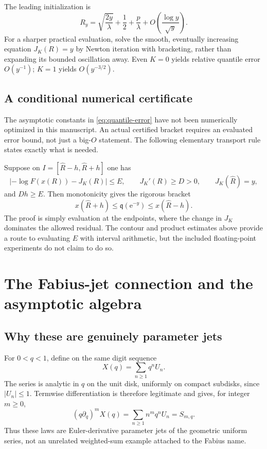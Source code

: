\documentclass[11pt,a4paper]{article}
\numberwithin{equation}{section}
\theoremstyle{definition}
\newcommand{\ee}{\mathrm e}
\begin{document}
The leading initialization is
\begin{equation}
 R_y=\sqrt{\frac{2y}{\lambda}}+\frac12+\frac p\lambda
       +O\left(\frac{\log y}{\sqrt y}\right).
 \label{eq:quantile-start}
\end{equation}
For a sharper practical evaluation, solve the smooth, eventually increasing equation $J_K(R)=y$ by Newton iteration with bracketing, rather than expanding its bounded oscillation away. Even $K=0$ yields relative quantile error $O(y^{-1})$; $K=1$ yields $O(y^{-3/2})$.

\subsection{A conditional numerical certificate}
The asymptotic constants in \eqref{eq:quantile-error} have not been numerically optimized in this manuscript. An actual certified bracket requires an evaluated error bound, not just a big-$O$ statement. The following elementary transport rule states exactly what is needed.

Suppose on $I=[\widehat R-h,\widehat R+h]$ one has
\[
 |{-\log F(x(R))}-J_K(R)|\leq E,\qquad J_K'(R)\geq D>0,
 \qquad J_K(\widehat R)=y,
\]
and $Dh\geq E$. Then monotonicity gives the rigorous bracket
\begin{equation}
 x(\widehat R+h)\leq\mathfrak q(\ee^{-y})\leq x(\widehat R-h).
 \label{eq:quantile-bracket}
\end{equation}
The proof is simply evaluation at the endpoints, where the change in $J_K$ dominates the allowed residual. The contour and product estimates above provide a route to evaluating $E$ with interval arithmetic, but the included floating-point experiments do not claim to do so.

\section{The Fabius-jet connection and the asymptotic algebra}
\label{sec:interpretation}

\subsection{Why these are genuinely parameter jets}
For $0<q<1$, define on the same digit sequence
\[
 X(q)=\sum_{n\geq1}q^nU_n.
\]
The series is analytic in $q$ on the unit disk, uniformly on compact subdisks, since $|U_n|\leq1$. Termwise differentiation is therefore legitimate and gives, for integer $m\geq0$,
\begin{equation}
 (q\partial_q)^mX(q)=\sum_{n\geq1}n^m q^nU_n=S_{m,q}.
 \label{eq:Euler-jets}
\end{equation}
Thus these laws are Euler-derivative parameter jets of the geometric uniform series, not an unrelated weighted-sum example attached to the Fabius name.
\end{document}
